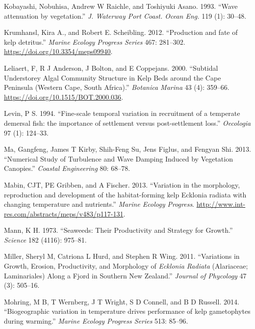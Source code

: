 \documentclass[
  a4paper,
]{article}
\begin{document}
\leavevmode\hypertarget{ref-Kobayashi1993-os}{}%
Kobayashi, Nobuhisa, Andrew W Raichle, and Toshiyuki Asano. 1993. ``Wave
attenuation by vegetation.'' \emph{J. Waterway Port Coast. Ocean Eng.}
119 (1): 30--48.

\leavevmode\hypertarget{ref-Krumhansl2012}{}%
Krumhansl, Kira A., and Robert E. Scheibling. 2012. ``Production and
fate of kelp detritus.'' \emph{Marine Ecology Progress Series} 467:
281--302. \url{https://doi.org/10.3354/meps09940}.

\leavevmode\hypertarget{ref-Leliaert2000a}{}%
Leliaert, F, R J Anderson, J Bolton, and E Coppejans. 2000. ``Subtidal
Understorey Algal Community Structure in Kelp Beds around the Cape
Peninsula (Western Cape, South Africa).'' \emph{Botanica Marina} 43 (4):
359--66. \url{https://doi.org/10.1515/BOT.2000.036}.

\leavevmode\hypertarget{ref-Levin1994-qf}{}%
Levin, P S. 1994. ``Fine-scale temporal variation in recruitment of a
temperate demersal fish: the importance of settlement versus
post-settlement loss.'' \emph{Oecologia} 97 (1): 124--33.

\leavevmode\hypertarget{ref-Mia2013}{}%
Ma, Gangfeng, James T Kirby, Shih-Feng Su, Jens Figlus, and Fengyan Shi.
2013. ``Numerical Study of Turbulence and Wave Damping Induced by
Vegetation Canopies.'' \emph{Coastal Engineering} 80: 68--78.

\leavevmode\hypertarget{ref-mabin2013}{}%
Mabin, CJT, PE Gribben, and A Fischer. 2013. ``Variation in the
morphology, reproduction and development of the habitat-forming kelp
Ecklonia radiata with changing temperature and nutrients.'' \emph{Marine
Ecology Progress}.
\url{http://www.int-res.com/abstracts/meps/v483/p117-131}.

\leavevmode\hypertarget{ref-Mann1973}{}%
Mann, K H. 1973. ``Seaweeds: Their Productivity and Strategy for
Growth.'' \emph{Science} 182 (4116): 975--81.

\leavevmode\hypertarget{ref-Miller2011-pm}{}%
Miller, Sheryl M, Catriona L Hurd, and Stephen R Wing. 2011.
``Variations in Growth, Erosion, Productivity, and Morphology of
\emph{Ecklonia Radiata} (Alariaceae; Laminariales) Along a Fjord in
Southern New Zealand.'' \emph{Journal of Phycology} 47 (3): 505--16.

\leavevmode\hypertarget{ref-Mohring2014-bk}{}%
Mohring, M B, T Wernberg, J T Wright, S D Connell, and B D Russell.
2014. ``Biogeographic variation in temperature drives performance of
kelp gametophytes during warming.'' \emph{Marine Ecology Progress
Series} 513: 85--96.
\end{document}

